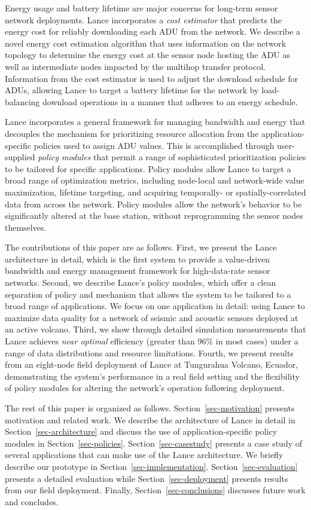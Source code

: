 Energy usage and battery lifetime are major concerns for long-term
sensor network deployments. 
Lance incorporates a {\em cost estimator} that
predicts the energy cost for reliably
downloading each ADU from the network. We describe a novel energy cost
estimation algorithm that uses information on the network topology to 
determine the energy cost at the sensor node hosting the ADU as well
as intermediate nodes impacted by the multihop transfer protocol. 
Information from the cost estimator is used to adjust the download
schedule for ADUs, allowing Lance to target a battery lifetime for 
the network by load-balancing download operations in a manner that
adheres to an energy schedule.

Lance incorporates a general framework for managing bandwidth and
energy that decouples the mechanism for prioritizing resource allocation from
the application-specific policies used to assign ADU values.
This is accomplished through user-supplied {\em policy modules} that
permit a range of sophisticated prioritization policies to be
tailored for specific applications. Policy modules allow Lance to
target a broad range of optimization metrics, including node-local and
network-wide value maximization, lifetime targeting, 
and acquiring temporally-
or spatially-correlated data from across the network. 
Policy modules allow the network's behavior to be significantly altered
at the base station, without reprogramming the sensor nodes themselves.

The contributions of this paper are as follows. First, we present the
Lance architecture in detail, which is the first system to provide 
a value-driven bandwidth and energy management framework for 
high-data-rate sensor networks. Second, we describe Lance's policy 
modules, which offer a clean separation of policy and mechanism that 
allows the system to be tailored to a broad range of applications. 
We focus on one application in detail: using Lance to maximize data 
quality for a network of seismic and acoustic sensors deployed at 
an active volcano. Third, we show through detailed simulation 
measurements that Lance achieves {\em near optimal} efficiency 
(greater than 96\% in most cases) under a range of data distributions 
and resource limitations. 
Fourth, we present results from 
an eight-node field deployment of Lance at Tungurahua Volcano, 
Ecuador, demonstrating the system's performance in a real 
field setting and the flexibility of policy modules for 
altering the network's operation following deployment. 

The rest of this paper is organized as follows.
Section~\ref{sec-motivation} presents motivation and related
work. We describe the architecture of Lance in detail in
Section~\ref{sec-architecture} and discuss the use of application-specific
policy modules in Section~\ref{sec-policies}.  Section~\ref{sec-casestudy}
presents a case study of several applications that can make use
of the Lance architecture.  We briefly describe our prototype in
Section~\ref{sec-implementation}.  Section~\ref{sec-evaluation}
presents a detailed evaluation while Section~\ref{sec-deployment}
presents results from our field deployment. Finally,
Section~\ref{sec-conclusions} discusses future work and concludes.

